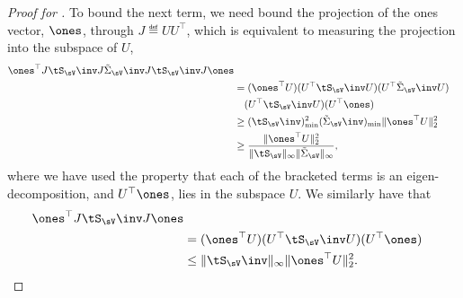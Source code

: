 \begin{proof}[Proof for ]
  To bound the next term, we need bound the projection of the ones
  vector, $\ones$, through $J \eqdef U U^\top$, which is equivalent to
  measuring the projection into the subspace of $U$,
  \begin{align*}
      \ones^\top J \tS_\sV\inv J \tilde\Sigma_\sV\inv J \tS_\sV\inv J \ones \\
      &=
      (\ones^\top U) (U^\top \tS_\sV\inv U) (U^\top \tilde\Sigma_\sV\inv U) \\
      &\quad (U^\top \tS_\sV\inv U) (U^\top \ones)  \\
      &\ge 
      (\tS_\sV\inv)^2_{\min}
      (\tilde\Sigma_\sV\inv)_{\min}
      \|\ones^\top U\|^2_2 \\
      &\ge 
      \frac{\|\ones^\top U\|^2_2}{\|\tS_\sV\|_\infty \|\tilde\Sigma_\sV\|_\infty},
  \end{align*}
  where we have used the property that each of the bracketed terms is an
  eigen-decomposition, and $U^\top \ones$, lies in the subspace $U$.
  We similarly have that
  \begin{align*}
      \ones^\top J \tS_\sV\inv J \ones \\
      &=
      (\ones^\top U) (U^\top \tS_\sV\inv U) (U^\top \ones) \\
      &\le 
      \|\tS_\sV\inv\|_{\infty}
      \|\ones^\top U\|^2_2.
  \end{align*}


\end{proof}
